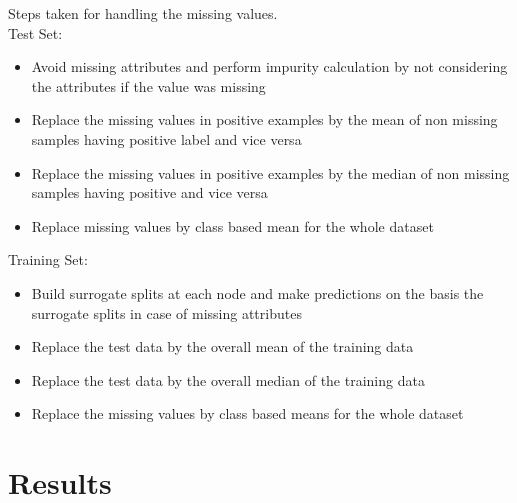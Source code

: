 \documentclass[a4paper]{article}
\begin{document}
Steps taken for handling the missing values.
 \\
Test Set:
\begin{itemize}
\item Avoid missing attributes and perform impurity calculation by not considering the attributes if the value was missing
\item Replace the missing values in positive examples by the mean of non missing samples having positive label and vice versa
\item Replace the missing values in positive examples by the median of non missing samples having positive and vice versa
\item Replace missing values by class based mean for the whole dataset
\end{itemize} 

Training Set:
\begin{itemize}
\item Build surrogate splits at each node and make predictions on the basis the surrogate splits in case of missing attributes 
\item Replace the test data by the overall mean of the training data
\item Replace the test data by the overall median of the training data
\item Replace the missing values by class based means for the whole dataset
\end{itemize} 


\section{Results}
\end{document}
